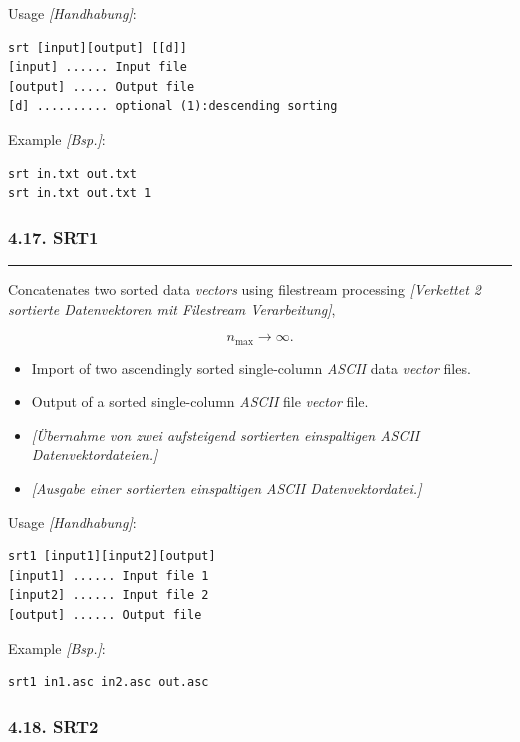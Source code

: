 \documentclass[
]{article}
\begin{document}
Usage \emph{{[}Handhabung{]}}:

\begin{verbatim}
srt [input][output] [[d]] 
[input] ...... Input file 
[output] ..... Output file 
[d] .......... optional (1):descending sorting
\end{verbatim}

Example \emph{{[}Bsp.{]}}:

\begin{verbatim}
srt in.txt out.txt
srt in.txt out.txt 1
\end{verbatim}

\hypertarget{srt1}{%
\subsubsection{4.17. SRT1}\label{srt1}}

\begin{center}\rule{0.5\linewidth}{0.5pt}\end{center}

Concatenates two sorted data \emph{vectors} using filestream processing
\emph{{[}Verkettet 2 sortierte Datenvektoren mit Filestream
Verarbeitung{]}},

\[n_{\max} \rightarrow \infty.\]

\begin{itemize}
\item
  Import of two ascendingly sorted single-column \emph{ASCII} data
  \emph{vector} files.
\item
  Output of a sorted single-column \emph{ASCII} file \emph{vector} file.
\item
  \emph{{[}Übernahme von zwei aufsteigend sortierten einspaltigen ASCII
  Datenvektordateien.{]}}
\item
  \emph{{[}Ausgabe einer sortierten einspaltigen ASCII
  Datenvektordatei.{]}}
\end{itemize}

Usage \emph{{[}Handhabung{]}}:

\begin{verbatim}
srt1 [input1][input2][output] 
[input1] ...... Input file 1 
[input2] ...... Input file 2 
[output] ...... Output file
\end{verbatim}

Example \emph{{[}Bsp.{]}}:

\begin{verbatim}
srt1 in1.asc in2.asc out.asc
\end{verbatim}

\hypertarget{srt2}{%
\subsubsection{4.18. SRT2}\label{srt2}}
\end{document}
